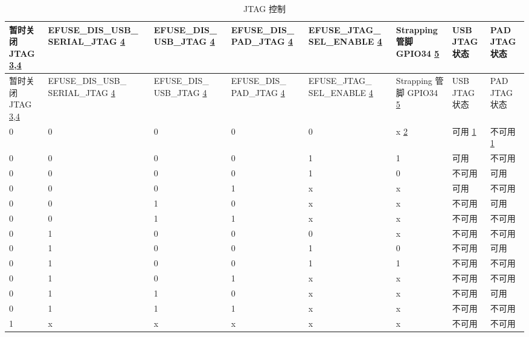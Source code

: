 \begin{longtable}{ | p{1.5cm} | p{2.6cm} | p{1.9cm} | p{1.9cm} | p{2.1cm} | p{1.4cm} | p{1.5cm} | p{1.5cm} | }
\caption{JTAG 控制} \label{tab:riscvcpu-jtag-control}\\
\hline\rowcolor{lightgray}
暂时关闭 JTAG \hyperref[JTAG footnote: 3]{3},\hyperref[JTAG footnote: 4]{4} & EFUSE\_DIS\_USB\_ SERIAL\_JTAG \hyperref[JTAG footnote: 4]{4} & EFUSE\_DIS\_ USB\_JTAG \hyperref[JTAG footnote: 4]{4} & EFUSE\_DIS\_ PAD\_JTAG \hyperref[JTAG footnote: 4]{4} & EFUSE\_JTAG\_ SEL\_ENABLE \hyperref[JTAG footnote: 4]{4} & Strapping 管脚 GPIO34 \hyperref[JTAG footnote: 5]{5} & USB JTAG 状态 & PAD JTAG 状态 \\ \hline
\endfirsthead
\hline
\rowcolor{lightgray}
暂时关闭 JTAG \hyperref[JTAG footnote: 3]{3},\hyperref[JTAG footnote: 4]{4} & EFUSE\_DIS\_USB\_ SERIAL\_JTAG \hyperref[JTAG footnote: 4]{4} & EFUSE\_DIS\_ USB\_JTAG \hyperref[JTAG footnote: 4]{4} & EFUSE\_DIS\_ PAD\_JTAG \hyperref[JTAG footnote: 4]{4} & EFUSE\_JTAG\_ SEL\_ENABLE \hyperref[JTAG footnote: 4]{4} & Strapping 管脚 GPIO34 \hyperref[JTAG footnote: 5]{5} & USB JTAG 状态 & PAD JTAG 状态 \\ \hline
\hline
\endhead
\endfoot

0 & 0 & 0 & 0 & 0 & x \hyperref[JTAG footnote: 2]{2}	& 可用	 \hyperref[JTAG footnote: 1]{1}  &     不可用  \hyperref[JTAG footnote: 1]{1}  \\\hline
0 & 0 & 0 & 0 & 1 & 1	& 可用	  &     不可用   \\\hline
0 & 0 & 0 & 0 & 1 & 0	& 不可用 & 	可用 \\\hline
0 & 0 & 0 & 1 & x & x	& 可用   & 	不可用 \\\hline
0 & 0 & 1 & 0 & x & x	& 不可用 & 	可用 \\\hline
0 & 0 & 1 & 1 & x & x	& 不可用 & 	不可用 \\\hline
0 & 1 & 0 & 0 & 0 & x	& 不可用 & 	不可用 \\\hline
0 & 1 & 0 & 0 & 1 & 0	& 不可用 & 	可用 \\\hline
0 & 1 & 0 & 0 & 1 & 1	& 不可用 & 	不可用 \\\hline
0 & 1 & 0 & 1 & x & x	& 不可用 & 	不可用 \\\hline
0 & 1 & 1 & 0 & x & x	& 不可用 & 	可用 \\\hline
0 & 1 & 1 & 1 & x & x	& 不可用 & 	不可用 \\\hline
1 & x & x & x & x & x	& 不可用 & 	不可用 \\\hline

\end{longtable}

